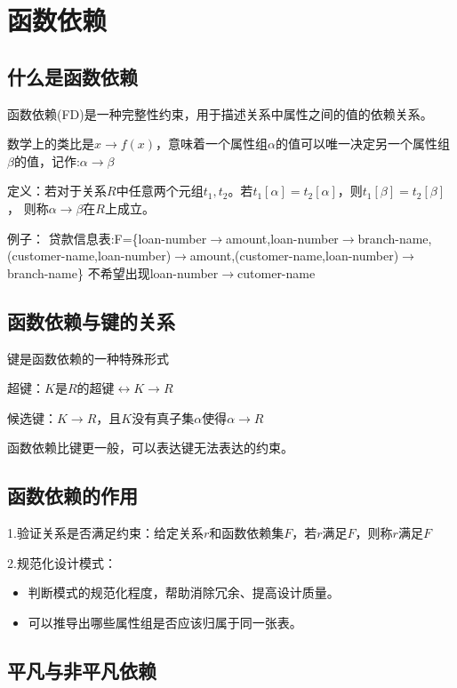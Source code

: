 \section{函数依赖}

\subsection{什么是函数依赖}

函数依赖(FD)是一种完整性约束，用于描述关系中属性之间的值的依赖关系。

数学上的类比是$x\to f(x)$，意味着一个属性组$\alpha$的值可以唯一决定另一个属性组$\beta$的值，记作:$\alpha\to\beta$

定义：若对于关系$R$中任意两个元组$t_1,t_2$。若$t_1[\alpha]=t_2[\alpha]$，则$t_1[\beta]=t_2[\beta]$，
则称$\alpha\to\beta$在$R$上成立。

例子：
贷款信息表:F=\{loan-number$\to$amount,loan-number$\to$branch-name,(customer-name,loan-number)$\to$amount,(customer-name,loan-number)$\to$branch-name\}
不希望出现loan-number$\to$cutomer-name 

\subsection{函数依赖与键的关系}

键是函数依赖的一种特殊形式

超键：$K$是$R$的超键$\leftrightarrow K\to R$

候选键：$K\to R$，且$K$没有真子集$\alpha$使得$\alpha\to R$

函数依赖比键更一般，可以表达键无法表达的约束。

\subsection{函数依赖的作用}

1.验证关系是否满足约束：给定关系$r$和函数依赖集$F$，若$r$满足$F$，则称$r$满足$F$

2.规范化设计模式：
\begin{itemize}
    \item 判断模式的规范化程度，帮助消除冗余、提高设计质量。
    \item 可以推导出哪些属性组是否应该归属于同一张表。
\end{itemize}

\subsection{平凡与非平凡依赖}

